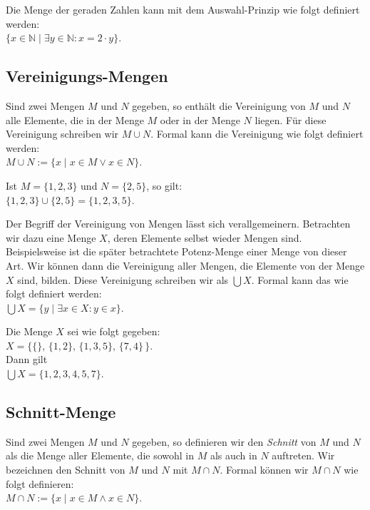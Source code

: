 \example
Die Menge der geraden Zahlen kann mit dem Auswahl-Prinzip wie folgt definiert werden: \\[0.2cm]
\hspace*{1.3cm} $\{ x \in \mathbb{N} \;|\; \exists y\in \mathbb{N}: x = 2 \cdot y \}$.  \eox

\subsection{Vereinigungs-Mengen}
Sind zwei Mengen $M$ und $N$ gegeben, so enth\"{a}lt die Vereinigung von $M$ und $N$ alle Elemente, die 
 in der Menge $M$ oder in der Menge $N$ liegen.  F\"{u}r diese Vereinigung schreiben wir $M \cup N$.
Formal kann die Vereinigung wie folgt definiert werden: \\[0.2cm]
\hspace*{1.3cm} $M \cup N := \{ x \;|\; x \in M \vee x \in N \}$. 
\vspace{0.2cm}

\example
Ist  $M = \{1,2,3\}$ und $N = \{2,5\}$, so gilt: \\[0.2cm]
\hspace*{1.3cm} $\{1,2,3\} \cup \{2,5\} = \{1,2,3,5\}$. 
\eox
\vspace{0.2cm}

\noindent
Der Begriff der Vereinigung von Mengen l\"{a}sst sich verallgemeinern.  Betrachten
wir dazu eine Menge $X$, deren Elemente selbst wieder Mengen sind. Beispielsweise ist die 
sp\"{a}ter betrachtete Potenz-Menge 
einer Menge von dieser Art.  Wir k\"{o}nnen dann die Vereinigung aller Mengen, die Elemente
von der Menge $X$ sind, bilden.  Diese Vereinigung schreiben wir als $\bigcup X$.  Formal
kann das wie folgt definiert werden: \\[0.2cm]
\hspace*{1.3cm} $\bigcup X = \{ y \;|\; \exists x \in X: y \in x \}$.

\example
Die Menge $X$ sei wie folgt gegeben: \\[0.2cm]
\hspace*{1.3cm} $X = \big\{ \{\},\, \{1,2\}, \, \{1,3,5\}, \, \{7,4\}\,\big\}$. \\[0.2cm]
Dann gilt \\[0.2cm]
\hspace*{1.3cm} $\bigcup X = \{ 1, 2, 3, 4, 5, 7 \}$.
\eox

\subsection{Schnitt-Menge}
Sind zwei Mengen $M$ und $N$ gegeben, so definieren wir den \emph{Schnitt} von
$M$ und $N$ als die Menge aller Elemente, die sowohl in $M$ als auch in $N$
auftreten.  Wir bezeichnen den Schnitt von $M$ und $N$ mit $M \cap N$.
Formal k\"{o}nnen wir $M \cap N$ wie folgt definieren: \\[0.2cm]
\hspace*{1.3cm} $M \cap N := \{ x \mid x \in M \wedge x \in N \}$. 

